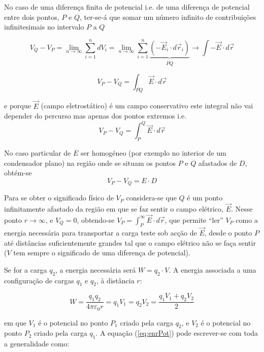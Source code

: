 \documentclass[a4paper,twoside,12pt]{article}      %
\begin{document}
No caso de uma diferença finita de potencial i.e. de uma diferença de potencial entre dois pontos, $P$ e $Q$, ter-se-á que somar um número infinito de contribuições infinitesimais no intervalo $P$ a $Q$

\begin{equation}
V_Q-V_P  = \lim_{n  \to \infty } \sum_{i=1}^n dV_i = \lim_{n \to \infty } \sum_{i=1}^n \underbrace{( - \vec{E}_i \cdot d\vec{r}_i )}_{\bar{PQ}} \rightarrow \int - \vec{E} \cdot d\vec{r}
\end{equation}

\begin{equation*} 
V_P - V_Q  = \int_{\bar{PQ}}  \vec{E} \cdot d \vec{r}
\end{equation*}

e porque $\vec{E}$ (campo eletrostático) é um campo conservativo este integral não vai depender do percurso mas apenas dos pontos extremos i.e.
\begin{equation*} 
V_P - V_Q  = \int_P^Q  \vec{E} \cdot d\vec{r}
\end{equation*}


No caso particular de $E$ ser homogéneo (por exemplo no interior de um condensador plano)  na região onde se situam os pontos $P$ e $Q$ afastados de $D$, obtém-se 
\begin{equation}\label{eq:difPot}
V_P - V_Q  =  E\cdot D
\end{equation}

Para se obter o significado físico de $V_P$ considera-se que $Q$ é um ponto infinitamente
afastado da região em que se faz sentir o campo elétrico, $\vec{E}$.
Nesse ponto $r \to \infty $, e $V_Q=0$,
obtendo-se $V_P =  \int_P^\infty  \vec{E} \cdot d\vec{r}$, que permite ``ler'' $V_P$ como a energia necessária para transportar a carga teste sob acção de $\vec{E}$, desde o ponto $P$ até distâncias suficientemente grandes tal que
o campo elétrico não se faça sentir ($V$ tem sempre o significado de uma diferença de potencial).

Se for a carga $q_2$, a energia necessária será $W= q_2\cdot V$. A energia associada a uma configuração de cargas $q_1$ e $q_2$, à distância $r$:

\begin{equation}\label{eq:enrPot}
 W = \frac{q_1 q_2}{4 \pi \varepsilon_0 r} = q_1 V_1 = q_2 V_2 =  \frac{q_1 V_1 +q_2 V_2}{2} 
\end{equation}

em que $V_1$ é o potencial no ponto $P_1$ criado pela carga $q_2$, e $V_2$ é o potencial no ponto $P_2$ criado pela carga $q_1$. A equação (\ref{eq:enrPot}) pode escrever-se com toda a generalidade como:
\end{document}

